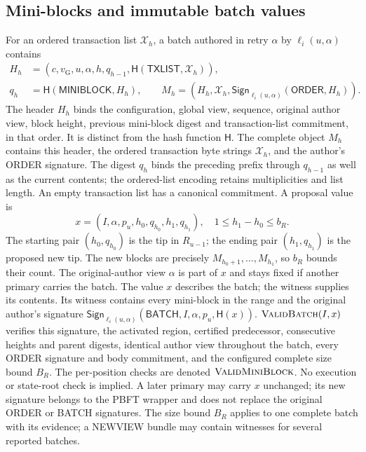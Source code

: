 \documentclass[11pt,a4paper,onecolumn]{article}
\newcommand{\Hash}{\mathsf H}
\newcommand{\Sig}{\mathsf{Sign}}
\newcommand{\gv}{v_{\mathrm G}}
\newcommand{\Tag}[1]{\mathsf{#1}}
\newcommand{\Proc}[1]{\textnormal{\textsc{#1}}}
\theoremstyle{remark}\newtheorem{example}[definition]{Example}
\begin{document}
\subsection{Mini-blocks and immutable batch values}\label{sec:batchvalues}
For an ordered transaction list $\mathcal X_h$, a batch authored in retry
$\alpha$ by $\ell_i(u,\alpha)$ contains
\begin{align}
 H_h&=(c,\gv,u,\alpha,h,q_{h-1},\Hash(\Tag{TXLIST},\mathcal X_h)),\label{eq:block}\\
 q_h&=\Hash(\Tag{MINIBLOCK},H_h),\qquad
 M_h=(H_h,\mathcal X_h,\Sig_{\ell_i(u,\alpha)}(\Tag{ORDER},H_h)).\nonumber
\end{align}
The header $H_h$ binds the configuration, global view, sequence, original
author view, block height, previous mini-block digest and transaction-list
commitment, in that order. It is distinct from the hash function $\Hash$.
The complete object $M_h$ contains this header, the ordered transaction byte
strings $\mathcal X_h$, and the author's ORDER signature. The digest $q_h$
binds the preceding prefix through $q_{h-1}$ as well as the current contents;
the ordered-list encoding retains multiplicities and list length.
An empty transaction list has a canonical commitment. A proposal value is
\begin{equation}\label{eq:proposal}
 x=(I,\alpha,p_u,h_0,q_{h_0},h_1,q_{h_1}),\quad 1\leq h_1-h_0\leq b_R.
\end{equation}
The starting pair $(h_0,q_{h_0})$ is the tip in $R_{u-1}$; the ending pair
$(h_1,q_{h_1})$ is the proposed new tip. The new blocks are precisely
$M_{h_0+1},\ldots,M_{h_1}$, so $b_R$ bounds their count. The original-author
view $\alpha$ is part of $x$ and stays fixed if another primary carries the
batch. The value $x$ describes the batch; the witness supplies its contents.
Its witness contains every mini-block in the range and the original author's
signature $\Sig_{\ell_i(u,\alpha)}(\Tag{BATCH},I,\alpha,p_u,\Hash(x))$.
$\Proc{ValidBatch}(I,x)$ verifies this signature, the activated region,
certified predecessor, consecutive heights and parent digests, identical author
view throughout the batch, every ORDER signature and body commitment, and the
configured complete size bound $B_R$. The per-position checks are denoted
$\Proc{ValidMiniBlock}$. No execution or state-root check is implied.
A later primary may carry $x$ unchanged; its new signature belongs to the PBFT
wrapper and does not replace the original ORDER or BATCH signatures.
The size bound $B_R$ applies to one complete batch with its evidence; a
NEWVIEW bundle may contain witnesses for several reported batches.
\end{document}
